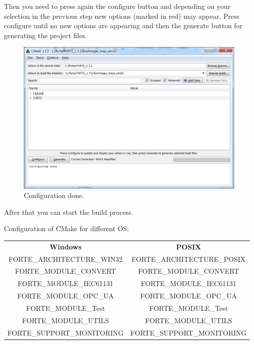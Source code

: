 Then you need to press again the configure button and depending on your selection in the previous step new options (marked in red) may appear. Press configure until no new options are appearing and then the generate button for generating the project files.

\begin{figure}
\centering
\includegraphics{Figures/cmake-4}
\decoRule
\caption[CMake step 4]{Configuration done.}
\label{fig:cmake-4}
\end{figure}
 
After that you can start the build process.

Configuration of CMake for different OS:
\begin{table}
	\centering
		\begin{tabular}{c | c}
			\textbf{Windows} & \textbf{POSIX} \\
			FORTE\_ARCHITECTURE\_WIN32  & FORTE\_ARCHITECTURE\_POSIX \\
			FORTE\_MODULE\_CONVERT & FORTE\_MODULE\_CONVERT \\
			FORTE\_MODULE\_IEC61131 & FORTE\_MODULE\_IEC61131 \\
			FORTE\_MODULE\_OPC\_UA & FORTE\_MODULE\_OPC\_UA \\
			FORTE\_MODULE\_Test & FORTE\_MODULE\_Test \\
			FORTE\_MODULE\_UTILS & FORTE\_MODULE\_UTILS \\
			FORTE\_SUPPORT\_MONITORING & FORTE\_SUPPORT\_MONITORING \\
 
		\end{tabular}
\end{table}


